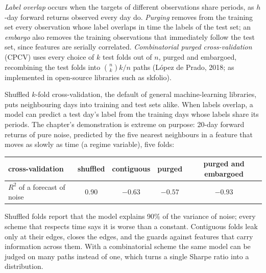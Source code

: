 \begin{definition}\label{def:rs:overfitting:purging}
\emph{Label overlap} occurs when the targets of different observations share periods, as $h$-day forward returns observed every day do.
\emph{Purging} removes from the training set every observation whose label overlaps in time the labels of the test set; an
\emph{embargo} also removes the training observations that immediately follow the test set, since features are serially correlated.
\emph{Combinatorial purged cross-validation} (CPCV) uses every choice of $k$ test folds out of $n$, purged and
embargoed, recombining the test folds into $\binom{n}{k}k/n$  paths (López de Prado, 2018; as implemented in open-source libraries such as skfolio).
\end{definition}

Shuffled $k$-fold cross-validation, the default of general machine-learning libraries, puts neighbouring days into training and test sets alike. When
labels overlap, a model can predict a test day's label from the training days whose labels share its periods. The chapter's demonstration is extreme on
purpose: 20-day forward returns of pure noise, predicted by the five nearest neighbours in a feature that moves as slowly as time (a regime variable), five
folds:

\begin{center}
\small
\begin{tabular}{@{}lcccc@{}}
\toprule
cross-validation & shuffled & contiguous & purged & purged and embargoed\\
\midrule
$R^2$ of a forecast of noise & 0.90 & $-0.63$ & $-0.57$ & $-0.93$\\
\bottomrule
\end{tabular}
\end{center}

Shuffled folds report that the model explains 90\% of the variance of noise; every scheme that respects time says it is worse than a constant. Contiguous
folds leak only at their edges,  closes the edges, and the  guards against features that carry information across them. With a combinatorial
scheme the same model can be judged on many paths instead of one, which turns a single  Sharpe ratio into a distribution.

